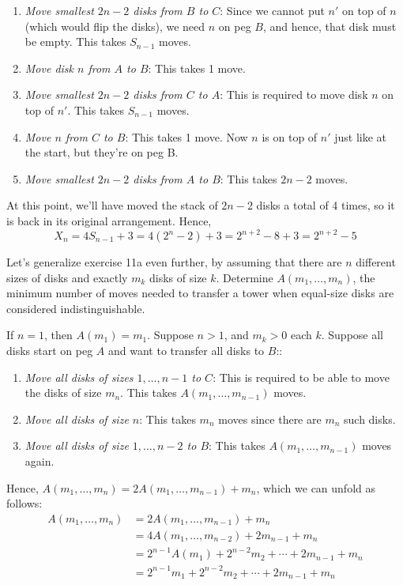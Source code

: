 \documentclass[12pt]{article}
\newenvironment{ex}[2][Exercise]{\begin{trivlist}
		\item[\hskip \labelsep {\bfseries #1}\hskip \labelsep {\bfseries #2.}]}{\end{trivlist}}
\newenvironment{sol}[1][Solution]{\begin{trivlist}
		\item[\hskip \labelsep {\bfseries #1:}]}{\end{trivlist}}
\begin{document}
\begin{sol}
\begin{enumerate}[label=(\alph*)]
\begin{enumerate}[label=(\roman*)]
			\item \emph{Move smallest $2n-2$ disks from $B$ to $C$}: Since we cannot
			put $n'$ on top of $n$ (which would flip the disks), we need $n$ on
			peg $B$, and hence, that disk must be empty. This takes $S_{n-1}$ moves.
			\item \emph{Move disk $n$ from $A$ to $B$}: This takes 1 move.
			\item \emph{Move smallest $2n-2$ disks from $C$ to $A$}: This is required
			to move disk $n$ on top of $n'$. This takes $S_{n-1}$ moves.
			\item \emph{Move $n$ from $C$ to $B$}: This takes 1 move. Now $n$ is
			on top of $n'$ just like at the start, but they're on peg B.
			\item \emph{Move smallest $2n-2$ disks from $A$ to $B$}: This takes $2n-2$ moves.
		\end{enumerate}
		At this point, we'll have moved the stack of $2n-2$ disks a total of 4 times,
		so it is back in its original arrangement. Hence,
		\[
		X_n=4S_{n-1}+3=4(2^{n}-2)+3=2^{n+2}-8+3=2^{n+2}-5
		\]
	\end{enumerate}
\end{sol}

\begin{ex}{12}
	Let's generalize exercise 11a even further, by assuming that there are $n$ different
	sizes of disks and exactly $m_k$ disks of size $k$. Determine $A(m_1, \ldots, m_n)$,
	the minimum number of moves needed to transfer a tower when equal-size disks are
	considered indistinguishable.
\end{ex}

\begin{sol}
	If $n=1$, then $A(m_1)=m_1$. Suppose $n>1$, and $m_k>0$ each $k$. Suppose
	all disks start on peg $A$ and want to transfer all disks to $B$::
	\begin{enumerate}[label=(\alph*)]
		\item \emph{Move all disks of sizes $1,\ldots,n-1$ to $C$}: This
		is required to be able to move the disks of size $m_n$. This takes
		$A(m_1,\ldots, m_{n-1})$ moves.
		\item \emph{Move all disks of size $n$}: This takes $m_n$ moves since
		there are $m_n$ such disks.
		\item \emph{Move all disks of size $1,\ldots, n-2$ to $B$}: This takes
		$A(m_1,\ldots, m_{n-1})$ moves again.
	\end{enumerate}
	Hence, $A(m_1,\ldots, m_n)=2A(m_1,\ldots,m_{n-1})+m_n$, which we can unfold as follows:
	\begin{align*}
		A(m_1,\ldots, m_n)&=2A(m_1,\ldots,m_{n-1})+m_n\\
		&=4A(m_1,\ldots, m_{n-2})+2m_{n-1}+m_n\\
		&=2^{n-1}A(m_1)+2^{n-2}m_2+\cdots+2m_{n-1}+m_n\\
		&=2^{n-1}m_1+2^{n-2}m_2+\cdots+2m_{n-1}+m_n
	\end{align*}
\end{sol}
\end{document}
